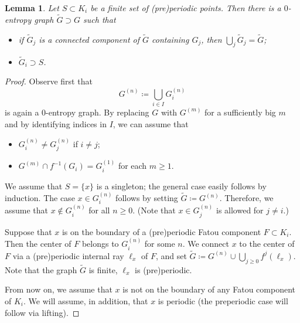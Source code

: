 \documentclass{amsart}
\theoremstyle{plain}
\newtheorem{lemma}[theorem]{Lemma}
\theoremstyle{definition}
\theoremstyle{remark}
\begin{document}
\begin{lemma}
\label{lem:ext 0 entr graph}
Let $S\subset K_i$ be a finite set of (pre)periodic points. Then there is a $0$-entropy graph $\widetilde G \supset G$ such that
\begin{itemize}
\item if $\widetilde G_j$ is a connected component of $\widetilde G$ containing $G_j$, then $\bigcup_j \widetilde G_j=\widetilde G$;
\item $\widetilde G_i \supset S$. 
\end{itemize} 
\end{lemma}
\begin{proof}
Observe first that 
\[G^{(n)}\coloneq \bigcup_{i\in I}G_i^{(n)}\]
 is again a $0$-entropy graph. By replacing $G$ with $G^{(m)}$ for a sufficiently big $m$ and by identifying indices in $I$, we can assume that
\begin{itemize} 
\item  $G_i^{(n)}\not= G_j^{(n)}$ if $i\not= j$;
\item $G^{(m)} \cap f^{-1}(G_i)= G_i^{(1)}$ for each $m\geq 1$. 
\end{itemize}  
 
We assume that $S=\{x\}$ is a singleton; the general case easily follows by induction. The case $x\in G_i^{(n)}$ follows by setting $\widetilde G\coloneq G^{(n)}$. Therefore, we assume that  $x\not\in G_i^{(n)}$ for all $n\ge0$. (Note that $x\in G_j^{(n)}$ is allowed for $j\not =i$.)
 




Suppose that $x$ is on the boundary of a (pre)periodic Fatou component $F\subset K_i$.  Then the center of $F$ belongs to $G^{(n)}_i$ for some $n$. We connect $x$ to the center of $F$ via a (pre)periodic internal ray $\ell_x$ of $F$, and set $\widetilde{G} \coloneq G^{(n)} \cup \bigcup_{j\geq 0} f^j(\ell_x)$.  Note that the graph $\widetilde{G}$ is finite,  $\ell_x$ is (pre)periodic. 



From now on, we assume that $x$ is not on the boundary of any Fatou component of $K_i$. We will assume, in addition, that $x$ is periodic (the preperiodic case will follow via lifting). 


\end{proof}
\end{document}
